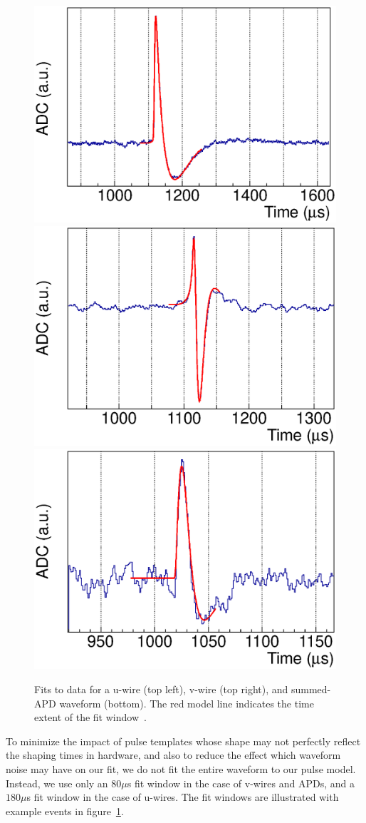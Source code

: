 \begin{figure}
\begin{center}
\includegraphics[keepaspectratio=true,width=.49\textwidth]{U_Wire_Fit.eps}
\includegraphics[keepaspectratio=true,width=.49\textwidth]{V_Wire_Fit.eps}
\includegraphics[keepaspectratio=true,width=.49\textwidth]{APD_Sum_Fit.eps}
\end{center}
\renewcommand{\baselinestretch}{1}
\small\normalsize
\begin{quote}
\caption{Fits to data for a u-wire (top left), v-wire (top right), and summed-APD waveform (bottom).  The red model line indicates the time extent of the fit window~\cite{ReconstructionDocument}.}
\label{fig:ReconExampleFits}
\end{quote}
\end{figure}
\renewcommand{\baselinestretch}{2}
\small\normalsize

To minimize the impact of pulse templates whose shape may not perfectly reflect the shaping times in hardware, and also to reduce the effect which waveform noise may have on our fit, we do not fit the entire waveform to our pulse model.  Instead, we use only an $80 \mu$s fit window in the case of v-wires and APDs, and a $180 \mu$s fit window in the case of u-wires.  The fit windows are illustrated with example events in figure~\ref{fig:ReconExampleFits}.

